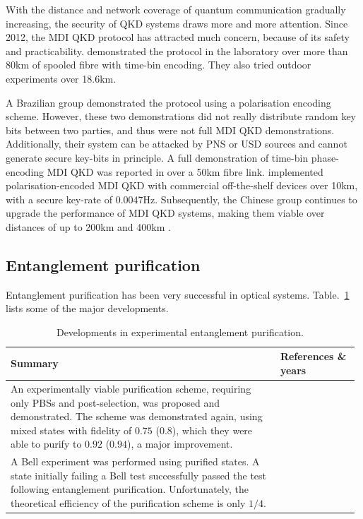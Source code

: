 \documentclass[aps, rmp, twocolumn, amsmath, amssymb, nofootinbib, superscriptaddress, longbibliography, floatfix, table-of-contents, eqsecnum]{revtex4-1}
\newcommand{\comment}[1]{{\color{blue}{\textbf{#1}}}}
\begin{document}
With the distance and network coverage of quantum communication gradually increasing, the security of QKD systems draws more and more attention. Since 2012, the MDI QKD protocol has attracted much concern, because of its safety and practicability. \cite{bib:PRL_111_130501} demonstrated the protocol in the laboratory over more than 80km of spooled fibre with time-bin encoding. They also tried outdoor experiments over 18.6km.

A Brazilian group \cite{bib:PRA_88_052303} demonstrated the protocol using a polarisation encoding scheme. However, these two demonstrations did not really distribute random key bits between two parties, and thus were not full MDI QKD demonstrations. Additionally, their system can be attacked by PNS or USD \comment{Define these acronyms!} sources and cannot generate secure key-bits in principle. A full demonstration of time-bin phase-encoding MDI QKD was reported in \cite{bib:PRL_111_130502} over a 50km fibre link. \cite{bib:PRL_112_190503} implemented polarisation-encoded MDI QKD with commercial off-the-shelf devices over 10km, with a secure key-rate of 0.0047Hz. Subsequently, the Chinese group continues to upgrade the performance of MDI QKD systems, making them viable over distances of up to 200km \cite{bib:PRL_113_190501} and 400km \cite{bib:arx160606821}.

%
%

\subsection{Entanglement purification} 

\comment{Section complete}

Entanglement purification has been very successful in optical systems. Table.~\ref{tab:ent_pur} lists some of the major developments.

\begin{table}[!htb]
\caption{Developments in experimental entanglement purification.} \label{tab:ent_pur}
\begin{tabular}{|p{0.755\linewidth}|p{0.22\linewidth}|}
	\hline
	Summary & References \& years \\
	\hline \hline
	An experimentally viable purification scheme, requiring only PBSs and post-selection, was proposed and demonstrated. The scheme was demonstrated again, using mixed states with fidelity of $0.75$ ($0.8$), which they were able to purify to $0.92$ ($0.94$), a major improvement. & \cite{bib:Nature_410_1067, bib:Nature_423_417} \\
	\hline
	A Bell experiment was performed using purified states. A state initially failing a Bell test successfully passed the test following entanglement purification. Unfortunately, the theoretical efficiency of the purification scheme is only $1/4$. & \cite{bib:PRL_94_040504, bib:Nature_410_1067} \\
	\hline
\end{tabular}
\end{table}
\end{document}
